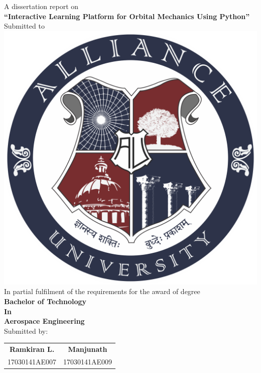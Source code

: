 \documentclass[12pt]{article}
\begin{document}
\begin{center}
\normalsize{A dissertation report on} \\ 
\vspace*{1em}
\Large{\textbf{\enquote{Interactive Learning Platform for Orbital Mechanics Using Python}}}\\ \vspace{0.5em}
\normalsize{Submitted to}\\ \vspace{1em}
\includegraphics[scale=0.7]{AU.png}\\ \vspace{1em}
\normalsize{In partial fulfilment of the requirements for the award of degree} \\
\Large{\textbf{Bachelor of Technology}}\\
\Large{\textbf{In}}\\
\Large{\textbf{Aerospace Engineering}}\\ \vspace*{1em}
\normalsize Submitted by: \vspace*{1em} \\
\normalsize
\begin{tabular}{cc}
\textbf{Ramkiran L.} & \textbf{Manjunath} \\ 
17030141AE007 & 17030141AE009 \\ 

\end{tabular}
\end{center}
\end{document}
